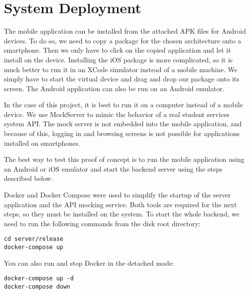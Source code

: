 \chapter{System Deployment}
The mobile application can be installed from the attached APK files for Android devices. To do so, we need to copy a package for the chosen architecture onto a smartphone. Then we only have to click on the copied application and let it install on the device. Installing the iOS package is more complicated, so it is much better to run it in an XCode simulator instead of a mobile machine. We simply have to start the virtual device and drag and drop our package onto its screen. The Android application can also be run on an Android emulator.

In the case of this project, it is best to run it on a computer instead of a mobile device. We use MockServer to mimic the behavior of a real student services system API. The mock server is not embedded into the mobile application, and because of this, logging in and browsing screens is not possible for applications installed on smartphones.

The best way to test this proof of concept is to run the mobile application using an Android or iOS emulator and start the backend server using the steps described below.

Docker and Docker Compose were used to simplify the startup of the server application and the API mocking service. Both tools are required for the next steps, so they must be installed on the system. To start the whole backend, we need to run the following commands from the disk root directory:
\begin{lstlisting}[numbers=none]
cd server/release
docker-compose up
\end{lstlisting}

\noindent You can also run and stop Docker in the detached mode:
\begin{lstlisting}[numbers=none]
docker-compose up -d
docker-compose down
\end{lstlisting}